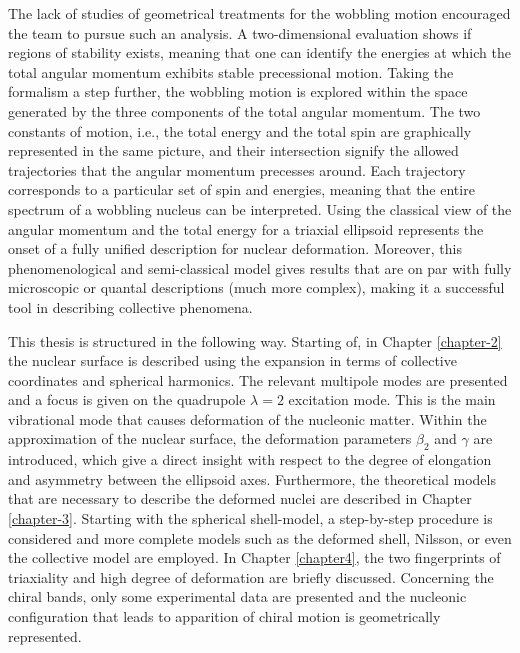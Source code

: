 The lack of studies of geometrical treatments for the wobbling motion encouraged the team to pursue such an analysis. A two-dimensional evaluation shows if regions of stability exists, meaning that one can identify the energies at which the total angular momentum exhibits stable precessional motion. Taking the formalism a step further, the wobbling motion is explored within the space generated by the three components of the total angular momentum. The two constants of motion, i.e., the total energy and the total spin are graphically represented in the same picture, and their intersection signify the allowed trajectories that the angular momentum precesses around. Each trajectory corresponds to a particular set of spin and energies, meaning that the entire spectrum of a wobbling nucleus can be interpreted. Using the classical view of the angular momentum and the total energy for a triaxial ellipsoid represents the onset of a fully unified description for nuclear deformation. Moreover, this phenomenological and semi-classical model gives results that are on par with fully microscopic or quantal descriptions (much more complex), making it a successful tool in describing collective phenomena.

This thesis is structured in the following way. Starting of, in Chapter \ref{chapter-2} the nuclear surface is described using the expansion in terms of collective coordinates and spherical harmonics. The relevant multipole modes are presented and a focus is given on the quadrupole $\lambda=2$ excitation mode. This is the main vibrational mode that causes deformation of the nucleonic matter. Within the approximation of the nuclear surface, the deformation parameters $\beta_2$ and $\gamma$ are introduced, which give a direct insight with respect to the degree of elongation and asymmetry between the ellipsoid axes. Furthermore, the theoretical models that are necessary to describe the deformed nuclei are described in Chapter \ref{chapter-3}. Starting with the spherical shell-model, a step-by-step procedure is considered and more complete models such as the deformed shell, Nilsson, or even the collective model are employed. In Chapter \ref{chapter4}, the two fingerprints of triaxiality and high degree of deformation are briefly discussed. Concerning the chiral bands, only some experimental data are presented and the nucleonic configuration that leads to apparition of chiral motion is geometrically represented. 

